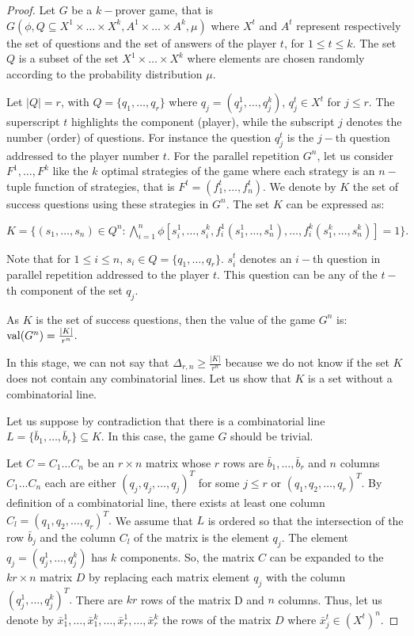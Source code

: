 \begin{proof}
  Let $G$ be a $k-$prover game, that is $G(\phi, Q\subseteq X^1 \times \ldots \times X^k, A^1 \times \ldots \times A^k, \mu)$ where $X^t$ and $A^t$ represent respectively the set of questions and the set of answers of the player $t$, for $1\leq t \leq k.$ The set $Q$ is a subset of the set $X^1 \times \ldots \times X^k$ where elements are chosen randomly  according to the probability distribution $\mu$.

 Let $|Q|=r$, with $Q=\{q_1, \ldots, q_r\}$ where $q_j=(q_j^1,\ldots, q_j^k)$, $q_j^t \in X^t$ for $j\leq r.$ The superscript  $t$ highlights the component (player), while the subscript $j$ denotes the number (order) of questions. For instance the question $q_j^t$ is the $j-$th question addressed to the player number $t.$  For the parallel repetition $G^n$, let us consider $F^1, \ldots, F^k$ like the $k$ optimal strategies of the game where each strategy is an $n-$tuple function of strategies, that is $F^t=(f_1^t,\ldots, f_n^t)$. We denote by $K$ the set of success questions using these strategies in $G^n.$ The set $K$ can be expressed as: 
 
$K=\{(s_1, \ldots, s_n) \in Q^n: \bigwedge\limits_{i=1}^n \phi \left[ s_i^1, \ldots, s_i^k, f_i^1(s_1^1, \ldots, s_n^1), \ldots, f_i^k(s_1^k, \ldots, s_n^k) \right]=1 \}.$

Note that for $1\leq i \leq n$,  $s_i \in Q=\{q_1, \ldots, q_r\}.$ $s_i^t$ denotes an $i-$th question in parallel repetition addressed to the player $t$. This question can be any of the $t-$th component of the set  $q_j.$
 
As $K$ is the set of success questions, then the value of the game $G^n$ is: $\mathrm{val} (G^n) = \frac{|K|}{r^n}.$
 
In this stage, we can not say that $\Delta_{r,n} \geq \frac{|K|}{r^n}$
because we do not know if the set  $K$ does not contain any combinatorial lines. Let us show that $K$ is a set without a combinatorial line.

Let us suppose by contradiction that there is a combinatorial line $L=\{\bar{b}_1, \ldots, \bar{b}_r \} \subseteq K.$ In this case,  the game  $G$ should be trivial.
 
Let $C=C_1\ldots C_n$ be an $r \times n$ matrix whose $r$ rows are $\bar{b}_1, \ldots, \bar{b}_r$ and $n$ columns $C_1\ldots C_n$ each are either $(q_j,q_j,\ldots,q_j)^T$ for some $j\leq r$ or $(q_1,q_2,\ldots,q_r)^T.$ By definition of a combinatorial line, there exists at least one column $C_l=(q_1,q_2,\ldots,q_r)^T.$ We assume that $L$ is ordered so that the intersection of the row $\bar{b}_j$ and the column $C_l$ of the matrix is the element $q_j.$ The element $q_j=(q_j^1,\ldots, q_j^k)$ has $k$ components. So, the  matrix $C$ can be expanded to the $kr \times n$ matrix $D$ by replacing each matrix element $q_j$ with the column $(q_j^1,\ldots, q_j^k)^T.$ There are $kr$ rows of the matrix D and $n$ columns. Thus, let us denote by $\bar{x}_1^1, \ldots, \bar{x}_1^k, \ldots, \bar{x}_r^1, \ldots, \bar{x}_r^k$ the rows of the matrix $D$ where $\bar{x}_j^t \in  (X^t)^n.$


\end{proof}
